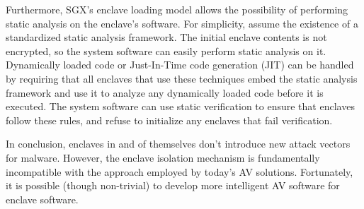 Furthermore, SGX's enclave loading model allows the possibility of performing
static analysis on the enclave's software. For simplicity, assume the existence
of a standardized static analysis framework.  The initial enclave contents is
not encrypted, so the system software can easily perform static analysis on it.
Dynamically loaded code or Just-In-Time code generation (JIT) can be handled by
requiring that all enclaves that use these techniques embed the static analysis
framework and use it to analyze any dynamically loaded code before it is
executed. The system software can use static verification to ensure that
enclaves follow these rules, and refuse to initialize any enclaves that fail
verification.

In conclusion, enclaves in and of themselves don't introduce new attack vectors
for malware. However, the enclave isolation mechanism is fundamentally
incompatible with the approach employed by today's AV solutions. Fortunately,
it is possible (though non-trivial) to develop more intelligent AV software for
enclave software.
